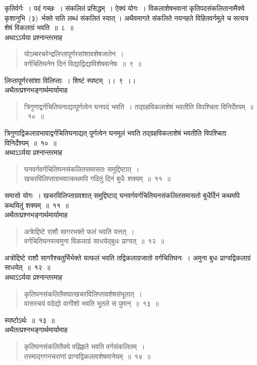 \documentclass[11pt, openany]{book}
\begin{document}
\newpage
\thispagestyle{fancy}
\fancyhf{}
\indent
कृतिर्वर्गः~। पदं गच्छः~। संकलितं प्रसिद्धम्~। ऐक्यं योगः~। विकलाशेषभवानां कृतिपदसंकलितानामैक्ये कृशानुभि~(३)~र्भक्ते सति लब्धं संकलितं स्यात् । अथैवमागते संकलिते नयनहते विहितवर्गमूले च सत्यत्र शेषं विकलाग्रं भवति~॥~८~॥\\
\indent
अथाऽऽर्यया प्रश्नान्तरमाह\textendash
\begin{quote}
{\ks योऽम्बरचरेन्द्रलिप्तापूर्णरसांशावशेषजातेन~।\\
वर्गचितिघनेन दिनं विद्याद्विद्याविशेषवानेषः~॥~९~॥}
\end{quote}
\indent
लिप्तापूर्णरसांशा विलिप्ताः~। शिष्टं स्पष्टम्~।।~९~।।\\
\indent
अथैतत्प्रश्नभङ्गार्थमार्यामाह\textendash
\begin{quote}
{\ks त्रिगुणाद्वर्गचितिघनाद्यत्पूर्णत्वेन घनपदं भवति~।
तद्ग्रहविकलाशेषं भवतीति विपश्चिता विनिर्देश्यम्~॥~१०~॥}
\end{quote}
\indent
त्रिगुणाद्विकलाग्रभावाद्वर्गचितिघनाद्यत् पूर्णत्वेन घनमूलं भवति तद्ग्रहविकलाशेषं भवतीति विपश्चिता विनिर्देश्यम्~॥~१०~॥\\
\indent
अथाऽऽर्यया प्रश्नान्तरमाह\textendash
\begin{quote}
{\ks घनवर्गवर्गचितिघनसंकलितसमासतः समुद्दिष्टात्~।\\
खचरविलिप्ताग्रभवात्कथमपि गदितुं दिनं बुधैः शक्यम्~॥~११~॥}
\end{quote}

\indent
समासो योगः~। खचरविलिप्ताग्रवशात् समुद्दिष्टाद् घनवर्गवर्गचितिघनसंकलितसमासतो बुधैर्दिनं कथमपि कथयितुं शक्यम्~॥~११~॥\\
अथैतत्प्रश्नभङ्गार्थमार्यामाह\textendash
\begin{quote}
{\ks अत्राेद्दिष्टे राशौ सागरभक्ते फलं भवति यत्तत्~।\\
वर्गचितिघनस्त्वमुना विकलाग्रं साधयेद्बुधः प्राग्वत्~॥~१२~॥}
\end{quote}
\indent
अत्रोद्दिष्टे राशौ सागरैश्चतुर्भिर्भक्ते यत्फलं भवति तद्विकलाग्रजातो वर्गचितिघनः~। अमुना बुधः प्राग्वद्विकलाग्रं साधयेत्~॥~१२~॥\\
\indent
अथाऽऽर्यया प्रश्नान्तरमाह\textendash
\begin{quote}
{\ks कृतिघनसंकलितैक्यात्खचरविलिप्तावशेषसंभूतात्~।\\
वासरचयं वदेद्यो वागीशो भवति भूतले स पुमान्~॥~१३~॥}
\end{quote}
\indent
स्पष्टोऽर्थः~॥~१३~॥\\
\indent
अथैतत्प्रश्नभङ्गार्थमार्यामाह\textendash
\begin{quote}
{\ks कृतिघनसंकलितैक्ये वह्निहृते भवति वर्गसंकलितम्~।\\
तस्माद्गगनचराणां प्राग्वद्विकलावशेषमानेयम्~॥~१४~॥}\\
\end{quote}
\end{document}
